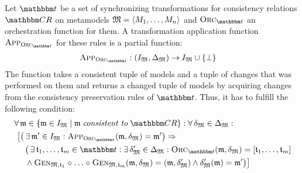\begin{definition} \label{def:applicationfunction}
    Let $\transformationset{T}$ be a set of synchronizing transformations for consistency relations $\consistencyrelationset{CR}$ on metamodels $\metamodeltuple{M} = \tupled{\metamodelsequence{M}{n}}$ and $\orcfunction{\transformationset{T}}$ an orchestration function for them.
    A transformation application function $\appfunction{\orcfunction{\transformationset{T}}}$ for these rules is a partial function:
    \begin{align*}
        &
        \appfunction{\orcfunction{\transformationset{T}}} : (\metamodeltupleinstanceset{M}, \changeuniverse{\metamodeltuple{M}}) \rightarrow \metamodeltupleinstanceset{M} \cup \setted{\bot}
    \end{align*}
    The function takes a consistent tuple of models and a tuple of changes that was performed on them and returns a changed tuple of models by acquiring changes from the consistency preservation rules of $\transformationset{t}$. %
    Thus, it has to fulfill the following condition:
    \begin{align*}
        &
        \forall \modeltuple{m} \in \setted{\modeltuple{m} \in  \metamodeltupleinstanceset{M} \mid \modeltuple{m} \consistenttomath \consistencyrelationset{CR}} : \forall \changetuple{\metamodeltuple{M}} \in \changeuniverse{\metamodeltuple{M}} : \\
        & \formulaskip[0.5em]
        \big[
            \big(\exists \modeltuple{m'} \in \metamodeltupleinstanceset{M} : 
            \appfunction{\orcfunction{\transformationset{T}}}(\modeltuple{m}, \changetuple{\metamodeltuple{M}}) = \modeltuple{m'} \big) \Rightarrow\\
            & \formulaskip[0.5em] \formulaskip
            \big(\exists \transformation{t}_{1}, \dots, \transformation{t}_{m} \in \transformationset{T} :
            \exists \changetuple{\metamodeltuple{M}}' \in \changeuniverse{\metamodeltuple{M}} : %
            \orcfunction{\transformationset{T}}(\modeltuple{m}, \changetuple{\metamodeltuple{M}}) = \sequenced{\transformation{t}_{1}, \dots, \transformation{t}_{m}} \\
            & \formulaskip[0.5em] \formulaskip
            \land \generalizationfunction{\metamodeltuple{M},\transformation{t}_{1}} \concatfunction \dots \concatfunction \generalizationfunction{\metamodeltuple{M},\transformation{t}_{m}}(\modeltuple{m}, \changetuple{\metamodeltuple{M}}) = (\modeltuple{m}, \changetuple{\metamodeltuple{M}}') %
            \land \changetuple{\metamodeltuple{M}}'(\modeltuple{m}) = \modeltuple{m'}
        \big)\big]
    \end{align*}
\end{definition}

